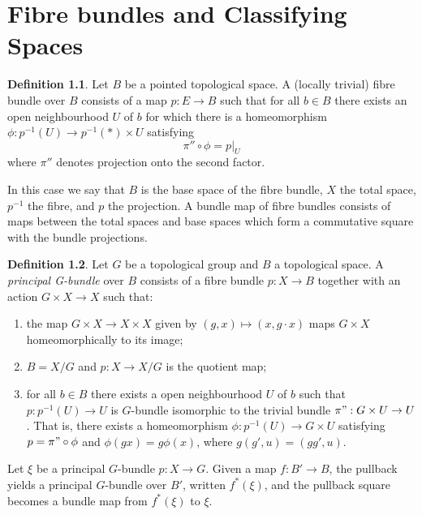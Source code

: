 \documentclass[A4,11pt,oneside]{book}
\theoremstyle{definition}
\newtheorem{defi}{Definition}
\begin{document}


\chapter{Fibre bundles and Classifying Spaces}

\begin{defi}
Let $B$ be a pointed topological space. A (locally trivial) fibre bundle over $B$ consists of a map $p:E\rightarrow B$ such that for all $b\in B$ there exists an open neighbourhood $U$ of $b$ for which there is a homeomorphism $\phi:p^{-1}(U)\rightarrow p^{-1}(*)\times U$ satisfying 
\begin{equation*}
\pi''\circ\phi=p\bigl |_U
\end{equation*}
where $\pi''$ denotes projection onto the second factor. 
\end{defi}
In this case we say that $B$ is  the base space of the fibre bundle, $X$ the total space, $p^{-1}$ the fibre, and $p$ the projection. A bundle map of fibre bundles consists of maps between the total spaces and base spaces which form a commutative square with the bundle projections. 
\begin{defi}
Let $G$ be a topological group and $B$ a topological space. A \emph{principal G-bundle} over $B$ consists of a fibre bundle $p:X\rightarrow B$ together with an action $G\times X\rightarrow X$ such that:
\begin{enumerate}
\item the  map $G\times X\rightarrow X\times X$ given by $(g,x)\mapsto (x,g\cdot x)$ maps $G\times X$ homeomorphically to its image;
\item $B= X/G$ and $p:X\rightarrow X/G$ is the quotient map;
\item for all $b\in B$ there exists a open neighbourhood $U$ of $b$ such that $p:p^{-1}(U)\rightarrow U$ is $G$-bundle isomorphic to the trivial bundle $\pi":G\times U\rightarrow U$. That is, there exists a homeomorphism $\phi:p^{-1}(U)\rightarrow G\times U$ satisfying $p=\pi"\circ\phi$ and $\phi(gx)=g\phi(x)$, where $g(g',u)=(gg',u)$.
\end{enumerate}
\end{defi}
Let $\xi$ be a principal $G$-bundle $p:X\rightarrow G$. Given a map $f:B'\rightarrow B$, the pullback yields a principal $G$-bundle over $B'$, written $f^{*}(\xi)$, and the pullback square becomes a bundle map from $f^{*}(\xi)$ to $\xi$.
\end{document}
